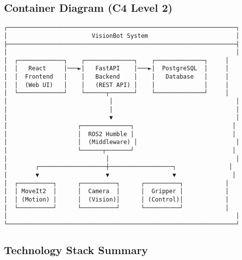 \documentclass[
]{article}
\begin{document}
\hypertarget{container-diagram-c4-level-2}{%
\subsection{Container Diagram (C4 Level
2)}\label{container-diagram-c4-level-2}}

\begin{verbatim}
┌─────────────────────────────────────────────────────────────────┐
│                        VisionBot System                         │
├─────────────────────────────────────────────────────────────────┤
│                                                                 │
│  ┌─────────────┐    ┌──────────────┐    ┌──────────────┐     │
│  │   React     │───►│   FastAPI    │───►│  PostgreSQL  │     │
│  │  Frontend   │    │   Backend    │    │   Database   │     │
│  │  (Web UI)   │    │   (REST API) │    │              │     │
│  └─────────────┘    └──────┬───────┘    └──────────────┘     │
│                             │                                   │
│                             │                                   │
│                             ▼                                   │
│                    ┌──────────────┐                            │
│                    │  ROS2 Humble │                            │
│                    │  (Middleware) │                            │
│                    └──────┬───────┘                            │
│                            │                                    │
│        ┌───────────────────┼──────────────────┐               │
│        ▼                   ▼                  ▼                │
│  ┌──────────┐      ┌──────────┐      ┌──────────┐            │
│  │ MoveIt2  │      │  Camera  │      │  Gripper │            │
│  │ (Motion) │      │  (Vision)│      │ (Control)│            │
│  └──────────┘      └──────────┘      └──────────┘            │
│                                                                 │
└─────────────────────────────────────────────────────────────────┘
\end{verbatim}

\hypertarget{technology-stack-summary}{%
\subsection{Technology Stack Summary}\label{technology-stack-summary}}
\end{document}
